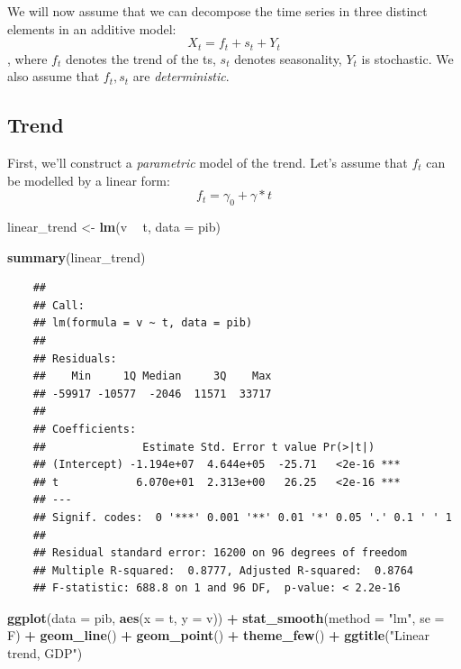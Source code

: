 \documentclass[11pt, a4paper]{report}
\newenvironment{Shaded}{\begin{snugshade}}{\end{snugshade}}
\newcommand{\DataTypeTok}[1]{\textcolor[rgb]{0.13,0.29,0.53}{#1}}
\newcommand{\KeywordTok}[1]{\textcolor[rgb]{0.13,0.29,0.53}{\textbf{#1}}}
\newcommand{\NormalTok}[1]{#1}
\newcommand{\OperatorTok}[1]{\textcolor[rgb]{0.81,0.36,0.00}{\textbf{#1}}}
\newcommand{\StringTok}[1]{\textcolor[rgb]{0.31,0.60,0.02}{#1}}
\theoremstyle{plain}
\theoremstyle{plain}
\theoremstyle{remark}
\begin{document}
We will now assume that we can decompose the time series in three
distinct elements in an additive model: \[ X_t = f_t+ s_t + Y_t \],
where \(f_t\) denotes the trend of the ts, \(s_t\) denotes
seasonality, \(Y_t\) is stochastic. We also assume that \(f_t, s_t\) are
\emph{deterministic}.

\subsection{Trend}

First, we'll construct a \emph{parametric} model of the trend. Let's
assume that \(f_t\) can be modelled by a linear form:
\[ f_t = \gamma_0 + \gamma *t \]

\begin{Shaded}
	\begin{Highlighting}[]
		\NormalTok{linear_trend <-}\StringTok{ }\KeywordTok{lm}\NormalTok{(v }\OperatorTok{~}\StringTok{ }\NormalTok{t, }\DataTypeTok{data =}\NormalTok{ pib)}
		
		\KeywordTok{summary}\NormalTok{(linear_trend)}
	\end{Highlighting}
\end{Shaded}

\begin{verbatim}
	## 
	## Call:
	## lm(formula = v ~ t, data = pib)
	## 
	## Residuals:
	##    Min     1Q Median     3Q    Max 
	## -59917 -10577  -2046  11571  33717 
	## 
	## Coefficients:
	##               Estimate Std. Error t value Pr(>|t|)    
	## (Intercept) -1.194e+07  4.644e+05  -25.71   <2e-16 ***
	## t            6.070e+01  2.313e+00   26.25   <2e-16 ***
	## ---
	## Signif. codes:  0 '***' 0.001 '**' 0.01 '*' 0.05 '.' 0.1 ' ' 1
	## 
	## Residual standard error: 16200 on 96 degrees of freedom
	## Multiple R-squared:  0.8777, Adjusted R-squared:  0.8764 
	## F-statistic: 688.8 on 1 and 96 DF,  p-value: < 2.2e-16
\end{verbatim}

\begin{Shaded}
	\begin{Highlighting}[]
		\KeywordTok{ggplot}\NormalTok{(}\DataTypeTok{data =}\NormalTok{ pib, }\KeywordTok{aes}\NormalTok{(}\DataTypeTok{x =}\NormalTok{ t, }\DataTypeTok{y =}\NormalTok{ v)) }\OperatorTok{+}\StringTok{ }\KeywordTok{stat_smooth}\NormalTok{(}\DataTypeTok{method =} \StringTok{"lm"}\NormalTok{, }
		\DataTypeTok{se =}\NormalTok{ F) }\OperatorTok{+}\StringTok{ }\KeywordTok{geom_line}\NormalTok{() }\OperatorTok{+}\StringTok{ }\KeywordTok{geom_point}\NormalTok{() }\OperatorTok{+}\StringTok{ }\KeywordTok{theme_few}\NormalTok{() }\OperatorTok{+}\StringTok{ }\KeywordTok{ggtitle}\NormalTok{(}\StringTok{"Linear trend, GDP"}\NormalTok{)}
	\end{Highlighting}
\end{Shaded}
\end{document}
